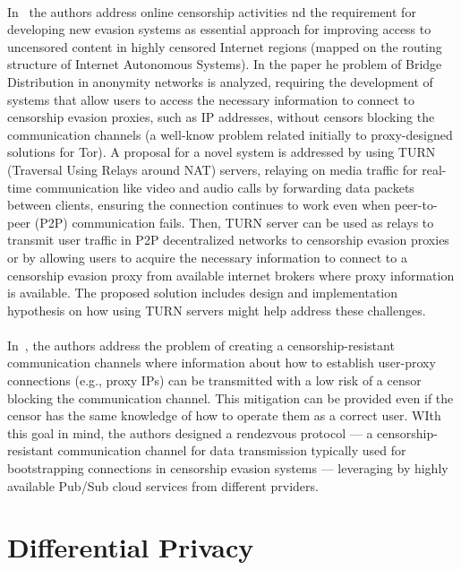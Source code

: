 \paragraph{} In~\cite{ARTIGO2} the authors address online censorship activities nd the requirement for developing new evasion systems as essential approach for improving access to uncensored content in highly censored Internet regions (mapped on the routing structure of Internet Autonomous Systems). In the paper he problem of Bridge Distribution in anonymity networks is analyzed, requiring the development of systems that allow users to access the necessary information to connect to censorship evasion proxies, such as IP addresses, without censors blocking the communication channels (a well-know problem related initially to proxy-designed solutions for Tor). A proposal for a novel system is addressed by using TURN (Traversal Using Relays around NAT) servers, relaying on media traffic for real-time communication like video and audio calls by forwarding data packets between clients, ensuring the connection continues to work even when peer-to-peer (P2P) communication fails. Then, TURN server can be used as relays to transmit user traffic in P2P decentralized networks to censorship evasion proxies or by allowing users to acquire the necessary information to connect to a censorship evasion proxy from available internet brokers where proxy information is available. The proposed solution includes design and implementation hypothesis on how using TURN servers might help address these challenges.

\paragraph{} In~\cite{ARTIGO3}, the authors address the problem of creating a censorship-resistant communication channels where information about how to establish user-proxy connections (e.g., proxy IPs) can be transmitted with a low risk of a censor blocking the communication channel. This mitigation can be provided even if the censor has the same knowledge of how to operate them as a correct user. WIth this goal in mind, the authors designed a rendezvous protocol — a censorship-resistant communication channel for data transmission typically used for bootstrapping connections in censorship evasion systems — leveraging by highly available Pub/Sub cloud services from different prviders.


\section{Differential Privacy}\label{sec:differential_privacy}


